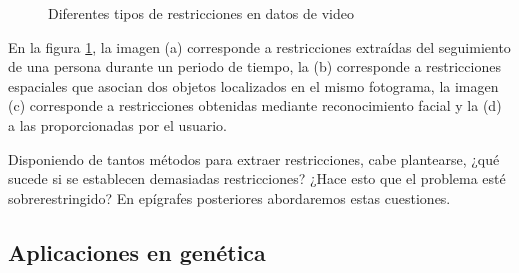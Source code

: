 \begin{figure}[bth]
	\myfloatalign
	\quad
	 \quad
	\quad
	\caption{Diferentes tipos de restricciones en datos de video \cite{Survey:2007}}\label{fig:figure12}
\end{figure}

En la figura \ref{fig:figure12}, la imagen (a) corresponde a restricciones extraídas del seguimiento de una persona durante un periodo de tiempo, la (b) corresponde a restricciones espaciales que asocian dos objetos localizados en el mismo fotograma, la imagen (c) corresponde a restricciones obtenidas mediante reconocimiento facial y la (d) a las proporcionadas por el usuario.

Disponiendo de tantos métodos para extraer restricciones, cabe plantearse, ¿qué sucede si se establecen demasiadas restricciones? ¿Hace esto que el problema esté sobrerestringido? En epígrafes posteriores abordaremos estas cuestiones.

\subsection{Aplicaciones en genética}

